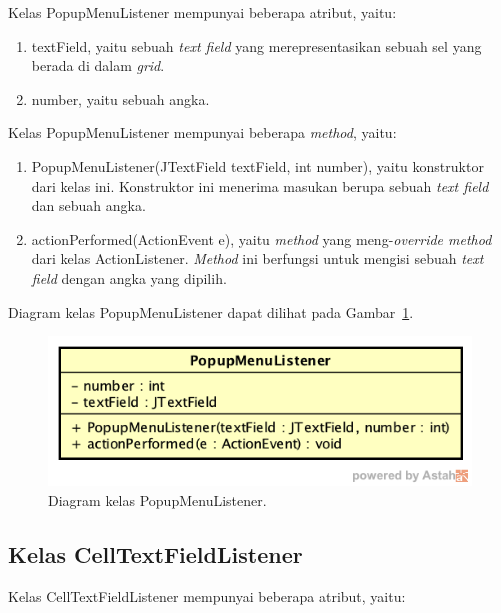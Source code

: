 Kelas PopupMenuListener mempunyai beberapa atribut, yaitu:

\begin{enumerate}
\item textField, yaitu sebuah \textit{text field} yang merepresentasikan sebuah sel yang berada di dalam \textit{grid}.
\item number, yaitu sebuah angka.
\end{enumerate}

Kelas PopupMenuListener mempunyai beberapa \textit{method}, yaitu:

\begin{enumerate}
\item PopupMenuListener(JTextField textField, int number), yaitu konstruktor dari kelas ini. Konstruktor ini menerima masukan berupa sebuah \textit{text field} dan sebuah angka.
\item actionPerformed(ActionEvent e), yaitu \textit{method} yang meng-\textit{override method} dari kelas ActionListener. \textit{Method} ini berfungsi untuk mengisi sebuah \textit{text field} dengan angka yang dipilih.
\end{enumerate}

Diagram kelas PopupMenuListener dapat dilihat pada Gambar~\ref{fig:diagramkelaspopupmenulistener}.

\begin{figure}
\centering
\captionsetup{justification=centering}
\includegraphics[scale=0.5]{Gambar/Perancangan/DiagramKelasPopupMenuListener.png}
\caption[Diagram kelas PopupMenuListener.]{Diagram kelas PopupMenuListener.}
\label{fig:diagramkelaspopupmenulistener}
\end{figure}

\subsection{Kelas CellTextFieldListener}
\label{sec:kelascelltextfieldlistener}

Kelas CellTextFieldListener mempunyai beberapa atribut, yaitu:

